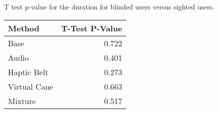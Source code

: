 
\centering
\caption{T test p-value for the duration for blinded users versus sighted users.}
\label{tab:ttest_duration}
\begin{tabular}{lr}
\toprule
      Method &  T-Test P-Value \\
\midrule
        Base &           0.722 \\
       Audio &           0.401 \\
 Haptic Belt &           0.273 \\
Virtual Cane &           0.663 \\
     Mixture &           0.517 \\
\bottomrule
\end{tabular}
